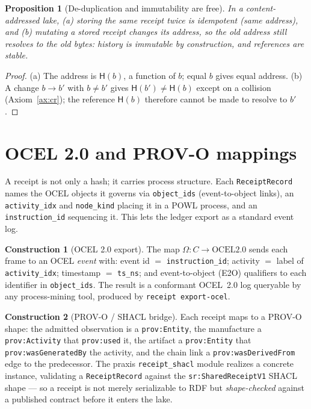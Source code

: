 \documentclass[11pt,oneside]{book}
\theoremstyle{definition}
\newtheorem{construction}{Construction}[chapter]
\theoremstyle{plain}
\newtheorem{proposition}[theorem]{Proposition}
\theoremstyle{remark}
\newcommand{\chainH}{\mathsf{H}}               %
\newcommand{\code}[1]{\texttt{#1}}
\newcommand{\Ledger}{C}               %
\begin{document}
\begin{proposition}[De-duplication and immutability are free]\label{prop:cas}
In a content-addressed lake, (a) storing the same receipt twice is idempotent (same address), and (b) mutating a stored receipt changes its address, so the old address still resolves to the old bytes: history is immutable by construction, and references are stable. %
\end{proposition}

\begin{proof}
(a) The address is $\chainH(b)$, a function of $b$; equal $b$ gives equal address. (b) A change $b\to b'$ with $b\ne b'$ gives $\chainH(b')\ne\chainH(b)$ except on a collision (Axiom~\ref{ax:cr}); the reference $\chainH(b)$ therefore cannot be made to resolve to $b'$. %
\end{proof}

\section{OCEL 2.0 and PROV-O mappings}

A receipt is not only a hash; it carries process structure. %
Each \code{ReceiptRecord} names the OCEL objects it governs via \code{object\_ids} (event-to-object links), an \code{activity\_idx} and \code{node\_kind} placing it in a POWL process, and an \code{instruction\_id} sequencing it. %
This lets the ledger export as a standard event log. %

\begin{construction}[OCEL 2.0 export]\label{con:ocel}
The map $\Omega:\Ledger\to\mathrm{OCEL2.0}$ sends each frame to an OCEL \emph{event} with: event id $=$ \code{instruction\_id}; activity $=$ label of \code{activity\_idx}; timestamp $=$ \code{ts\_ns}; and event-to-object (E2O) qualifiers to each identifier in \code{object\_ids}. %
The result is a conformant OCEL~2.0 log queryable by any process-mining tool, produced by \code{receipt export-ocel}. %
\end{construction}

\begin{construction}[PROV-O / SHACL bridge]\label{con:provo}
Each receipt maps to a PROV-O~\cite{provo} shape: the admitted observation is a \code{prov:Entity}, the manufacture a \code{prov:Activity} that \code{prov:used} it, the artifact a \code{prov:Entity} that \code{prov:wasGeneratedBy} the activity, and the chain link a \code{prov:wasDerivedFrom} edge to the predecessor. %
The praxis \code{receipt\_shacl} module realizes a concrete instance, validating a \code{ReceiptRecord} against the \code{sr:SharedReceiptV1} SHACL shape --- so a receipt is not merely serializable to RDF but \emph{shape-checked} against a published contract before it enters the lake. %
\end{construction}
\end{document}
